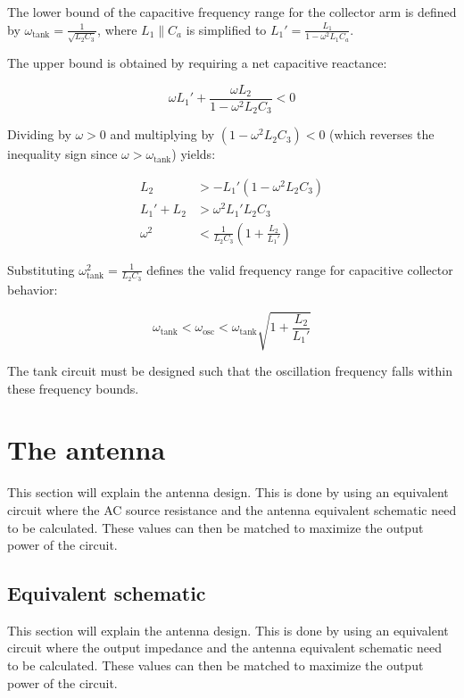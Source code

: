 The lower bound of the capacitive frequency range for the collector arm is defined by $\omega_{\text{tank}} = \frac{1}{\sqrt{L_2 C_3}}$, where $L_1 \parallel C_a$ is simplified to $L_1' = \frac{L_1}{1 - \omega^2 L_1 C_a}$.

The upper bound is obtained by requiring a net capacitive reactance:

\begin{equation}
	\omega L_1' + \frac{\omega L_2}{1 - \omega^2 L_2 C_3} < 0
\end{equation}

Dividing by $\omega > 0$ and multiplying by $(1 - \omega^2 L_2 C_3) < 0$ (which reverses the inequality sign since $\omega > \omega_{\text{tank}}$) yields:

\begin{align}
	L_2 &> -L_1' \left(1 - \omega^2 L_2 C_3\right) \nonumber \\
	L_1' + L_2 &> \omega^2 L_1' L_2 C_3 \nonumber \\
	\omega^2 &< \frac{1}{L_2 C_3} \left(1 + \frac{L_2}{L_1'}\right)
\end{align}

Substituting $\omega_{\text{tank}}^2 = \frac{1}{L_2 C_3}$ defines the valid frequency range for capacitive collector behavior:

\begin{equation}
	\omega_{\text{tank}} < \omega_{\text{osc}} < \omega_{\text{tank}} \sqrt{1 + \frac{L_2}{L_1'}}
\end{equation}

The tank circuit must be designed such that the oscillation frequency falls within these frequency bounds.

\section{The antenna}

This section will explain the antenna design. This is done by using an equivalent circuit where the AC source resistance and the antenna equivalent schematic need to be calculated. These values can then be matched to maximize the output power of the circuit.

\subsection{Equivalent schematic}

This section will explain the antenna design. This is done by using an equivalent circuit where the output impedance and the antenna equivalent schematic need to be calculated. These values can then be matched to maximize the output power of the circuit.

